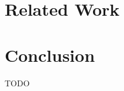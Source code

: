 \documentclass{sigplanconf}
\begin{document}
\section{Related Work}\label{sec:related}


\section{Conclusion}\label{sec:conclusion}

TODO





\end{document}
